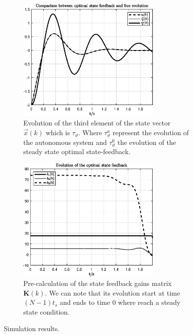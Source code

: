\documentclass[11pt,a4paper,oneside]{book}
\numberwithin{equation}{section}
\theoremstyle{it}
\theoremstyle{definition}
\begin{document}
\begin{figure}[H]
	\centering
	\begin{subfigure}{.5\textwidth}
		\centering
		\includegraphics[width = 200pt, 
		keepaspectratio]{figures/optimal_control/state32.eps}
		\captionsetup{width=0.65\textwidth, font=footnotesize}
		\caption{Evolution of the third element of the state vector 
			$\vec{x}(k)$ which is $\tau_{\vartheta}$. Where $\tau_{\vartheta}^a$ 
			represent the evolution of the autonomous system and $\tau_{\vartheta}^0$ 
			the evolution of the steady state optimal state-feedback.}
		\label{figure_msm_opt_state_f_3}
	\end{subfigure}%
	\begin{subfigure}{.5\textwidth}
		\centering
		\includegraphics[width = 200pt, 
		keepaspectratio]{figures/optimal_control/feedback_m2.eps}
		\captionsetup{width=0.65\textwidth, font=footnotesize}
		\caption{Pre-calculation of the state feedback gains matrix 
			$\mathbf{K}(k)$. We can note that its evolution start at time 
			$(N-1)t_s$ and ends to time $0$ where reach a steady state condition.}
		\label{figure_msm_opt_state_f_4}
	\end{subfigure}
	\captionsetup{width=0.5\textwidth, font=small}
	\caption{Simulation results.}
	\label{}
\end{figure}
\end{document}
